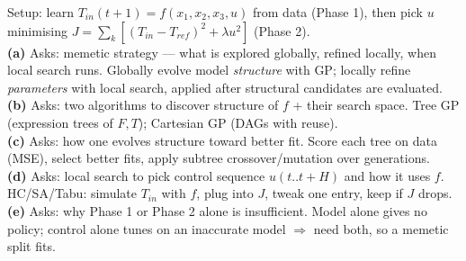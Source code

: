 Setup: learn \(T_{in}(t{+}1)=f(x_1,x_2,x_3,u)\) from data (Phase 1), then pick \(u\) minimising \(J=\sum_k[(T_{in}{-}T_{ref})^2+\lambda u^2]\) (Phase 2).\\
\textbf{(a)} Asks: memetic strategy --- what is explored globally, refined locally, when local search runs. Globally evolve model \emph{structure} with GP; locally refine \emph{parameters} with local search, applied after structural candidates are evaluated.\\
\textbf{(b)} Asks: two algorithms to discover structure of \(f\) + their search space. Tree GP (expression trees of \(F,T\)); Cartesian GP (DAGs with reuse).\\
\textbf{(c)} Asks: how one evolves structure toward better fit. Score each tree on data (MSE), select better fits, apply subtree crossover/mutation over generations.\\
\textbf{(d)} Asks: local search to pick control sequence \(u(t..t{+}H)\) and how it uses \(f\). HC/SA/Tabu: simulate \(T_{in}\) with \(f\), plug into \(J\), tweak one entry, keep if \(J\) drops.\\
\textbf{(e)} Asks: why Phase 1 or Phase 2 alone is insufficient. Model alone gives no policy; control alone tunes on an inaccurate model \(\Rightarrow\) need both, so a memetic split fits.
